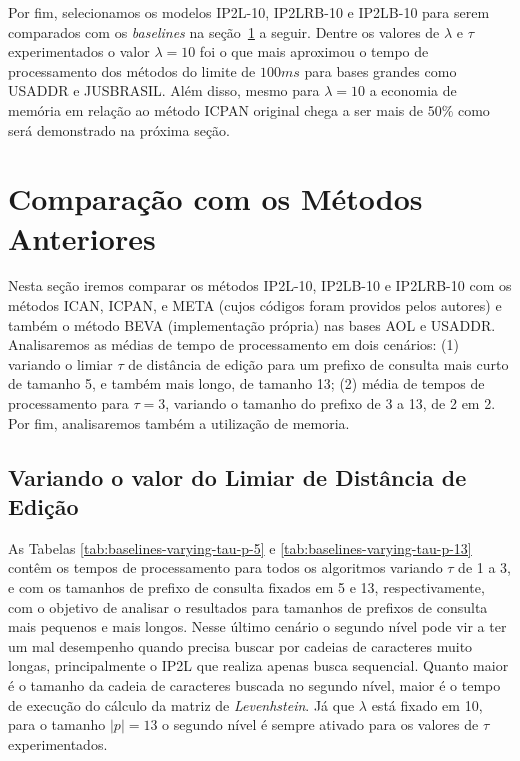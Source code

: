 Por fim, selecionamos os modelos IP2L-10, IP2LRB-10 e IP2LB-10 para serem comparados com os \textit{baselines} na seção~\ref{sec:comparison_baseline_methods} a seguir. Dentre os valores de $\lambda$ e $\tau$ experimentados o valor $\lambda=10$ foi o que mais aproximou o tempo de processamento dos métodos do limite de $100ms$ para bases grandes como USADDR e JUSBRASIL. Além disso, mesmo para $\lambda=10$ a economia de memória em relação ao método ICPAN original chega a ser mais de $50\%$ como será demonstrado na próxima seção.


\section{Comparação com os Métodos Anteriores}
\label{sec:comparison_baseline_methods}

Nesta seção iremos comparar os métodos IP2L-10, IP2LB-10 e IP2LRB-10 com os métodos ICAN, ICPAN, e META (cujos códigos foram providos pelos autores) e também o método BEVA (implementação própria) nas bases AOL e USADDR. Analisaremos as médias de tempo de processamento em dois cenários: (1) variando o limiar $\tau$ de distância de edição para um prefixo de consulta mais curto de tamanho 5, e também mais longo, de tamanho 13; (2) média de tempos de processamento para $\tau=3$, variando o tamanho do prefixo de 3 a 13, de 2 em 2. Por fim, analisaremos também a utilização de memoria.

\subsection{Variando o valor do Limiar de Distância de Edição}

As Tabelas \ref{tab:baselines-varying-tau-p-5} e \ref{tab:baselines-varying-tau-p-13} contêm os tempos de processamento para todos os algoritmos variando $\tau$ de 1 a 3, e com os tamanhos de prefixo de consulta fixados em 5 e 13, respectivamente, com o objetivo de analisar o resultados para tamanhos de prefixos de consulta mais pequenos e mais longos. Nesse último cenário o segundo nível pode vir a ter um mal desempenho quando precisa buscar por cadeias de caracteres muito longas, principalmente o IP2L que realiza apenas busca sequencial. Quanto maior é o tamanho da cadeia de caracteres buscada no segundo nível, maior é o tempo de execução do cálculo da matriz de \textit{Levenhstein}. Já que $\lambda$ está fixado em 10, para o tamanho $|p|=13$ o segundo nível é sempre ativado para os valores de $\tau$ experimentados.

